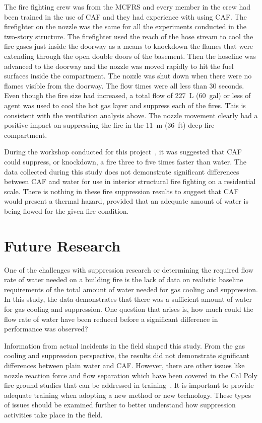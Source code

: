 \documentclass[12pt,oneside]{book}
\begin{document}
The fire fighting crew was from the MCFRS and every member in the crew had been trained in the use of CAF and they had experience with using CAF. The firefighter on the nozzle was the same for all the experiments conducted in the two-story structure. The firefighter used the reach of the hose stream to cool the fire gases just inside the doorway as a means to knockdown the flames that were extending through the open double doors of the basement. Then the hoseline was advanced to the doorway and the nozzle was moved rapidly to hit the fuel surfaces inside the compartment. The nozzle was shut down when there were no flames visible from the doorway. The flow times were all less than 30 seconds. Even though the fire size had increased, a total flow of 227~L (60~gal) or less of agent was used to cool the hot gas layer and suppress each of the fires. This is consistent with the ventilation analysis above. The nozzle movement clearly had a positive impact on suppressing the fire in the 11~m (36~ft) deep fire compartment.    

During the workshop conducted for this project~\cite{Grant:2011}, it was suggested that CAF could suppress, or knockdown, a fire three to five times faster than water. The data collected during this study does not demonstrate significant differences between CAF and water for use in interior structural fire fighting on a residential scale. There is nothing in these fire suppression results to suggest that CAF would present a thermal hazard, provided that an adequate amount of water is being flowed for the given fire condition.

\section{Future Research}

One of the challenges with suppression research or determining the required flow rate of water needed on a building fire is the lack of data on realistic baseline requirements of the total amount of water needed for gas cooling and suppression. In this study, the data demonstrates that there was a sufficient amount of water for gas cooling and suppression. One question that arises is, how much could the flow rate of water have been reduced before a significant difference in performance was observed? 

Information from actual incidents in the field shaped this study. From the gas cooling and suppression perspective, the results did not demonstrate significant differences between plain water and CAF. However, there are other issues like nozzle reaction force and flow separation which have been covered in the Cal Poly fire ground studies that can be addressed in training~\cite{Carracino:2013,Dicus:2013,LaPolla:2012}.  It is important to provide adequate training when adopting a new method or new technology. These types of issues should be examined further to better understand how suppression activities take place in the field.
\end{document}
